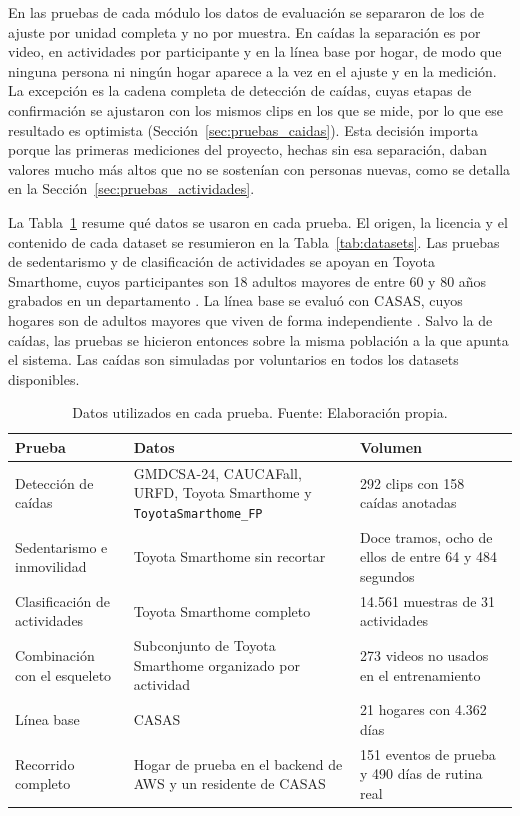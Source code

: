 En las pruebas de cada módulo los datos de evaluación se separaron de los de ajuste por unidad completa y no por muestra.
En caídas la separación es por video, en actividades por participante y en la línea base por hogar, de modo que ninguna persona ni ningún hogar aparece a la vez en el ajuste y en la medición.
La excepción es la cadena completa de detección de caídas, cuyas etapas de confirmación se ajustaron con los mismos clips en los que se mide, por lo que ese resultado es optimista (Sección~\ref{sec:pruebas_caidas}).
Esta decisión importa porque las primeras mediciones del proyecto, hechas sin esa separación, daban valores mucho más altos que no se sostenían con personas nuevas, como se detalla en la Sección~\ref{sec:pruebas_actividades}.

La Tabla~\ref{tab:datasets_pruebas} resume qué datos se usaron en cada prueba.
El origen, la licencia y el contenido de cada dataset se resumieron en la Tabla~\ref{tab:datasets}.
Las pruebas de sedentarismo y de clasificación de actividades se apoyan en Toyota Smarthome, cuyos participantes son 18 adultos mayores de entre 60 y 80 años grabados en un departamento \parencite{Das2019}.
La línea base se evaluó con CASAS, cuyos hogares son de adultos mayores que viven de forma independiente \parencite{Cook2013}.
Salvo la de caídas, las pruebas se hicieron entonces sobre la misma población a la que apunta el sistema.
Las caídas son simuladas por voluntarios en todos los datasets disponibles.

\begin{table}[H]
\centering
\caption[Datos utilizados en cada prueba.]{Datos utilizados en cada prueba. Fuente: Elaboración propia.}
\label{tab:datasets_pruebas}
\small
\begin{tabular}{@{}p{3.6cm}p{5.2cm}p{5.6cm}@{}}
\toprule
\textbf{Prueba} & \textbf{Datos} & \textbf{Volumen} \\
\midrule
Detección de caídas & GMDCSA-24, CAUCAFall, URFD, Toyota Smarthome y \texttt{ToyotaSmarthome\_FP} & 292 clips con 158 caídas anotadas \\
Sedentarismo e inmovilidad & Toyota Smarthome sin recortar & Doce tramos, ocho de ellos de entre 64 y 484 segundos \\
Clasificación de actividades & Toyota Smarthome completo & 14.561 muestras de 31 actividades \\
Combinación con el esqueleto & Subconjunto de Toyota Smarthome organizado por actividad & 273 videos no usados en el entrenamiento \\
Línea base & CASAS & 21 hogares con 4.362 días \\
Recorrido completo & Hogar de prueba en el backend de AWS y un residente de CASAS & 151 eventos de prueba y 490 días de rutina real \\
\bottomrule
\end{tabular}
\end{table}

